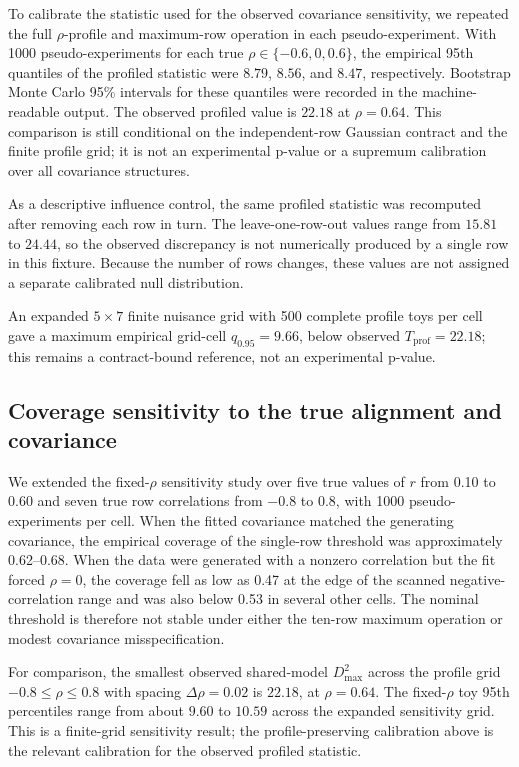 \documentclass[pdflatex,iicol,sn-mathphys-num]{sn-jnl}
\begin{document}
To calibrate the statistic used for the observed covariance sensitivity, we repeated
the full \(\rho\)-profile and maximum-row operation in each pseudo-experiment. With
1000 pseudo-experiments for each true \(\rho\in\{-0.6,0,0.6\}\), the empirical
95th quantiles of the profiled statistic were \(8.79\), \(8.56\), and \(8.47\),
respectively. Bootstrap Monte Carlo 95\% intervals for these quantiles were
recorded in the machine-readable output. The observed profiled value is \(22.18\)
at \(\rho=0.64\). This comparison is still conditional on the independent-row
Gaussian contract and the finite profile grid; it is not an experimental p-value
or a supremum calibration over all covariance structures.

As a descriptive influence control, the same profiled statistic was recomputed
after removing each row in turn. The leave-one-row-out values range from
\(15.81\) to \(24.44\), so the observed discrepancy is not numerically produced
by a single row in this fixture. Because the number of rows changes, these
values are not assigned a separate calibrated null distribution.

An expanded \(5\times7\) finite nuisance grid with 500 complete profile toys per cell
gave a maximum empirical grid-cell \(q_{0.95}=9.66\), below observed
\(T_{\mathrm{prof}}=22.18\); this remains a contract-bound reference, not an
experimental p-value.

\subsection{Coverage sensitivity to the true alignment and covariance}

We extended the fixed-\(\rho\) sensitivity study over five true values of \(r\) from
0.10 to 0.60 and seven true row correlations from \(-0.8\) to \(0.8\), with 1000
pseudo-experiments per cell. When the fitted covariance matched the generating
covariance, the empirical coverage of the single-row threshold was approximately
0.62--0.68.
When the data were generated with a nonzero correlation but the fit forced
\(\rho=0\), the coverage fell as low as 0.47 at the edge of the scanned
negative-correlation range and was also below 0.53 in several other cells. The
nominal threshold is therefore
not stable under either the ten-row maximum operation or modest covariance
misspecification.

For comparison, the smallest observed shared-model \(D_{\max}^2\) across the
profile grid \(-0.8\leq\rho\leq0.8\) with spacing \(\Delta\rho=0.02\) is
\(22.18\), at \(\rho=0.64\). The fixed-\(\rho\) toy 95th percentiles range from
about \(9.60\) to \(10.59\) across the expanded sensitivity grid. This is a
finite-grid sensitivity result; the profile-preserving calibration above is the
relevant calibration for the observed profiled statistic.
\end{document}
